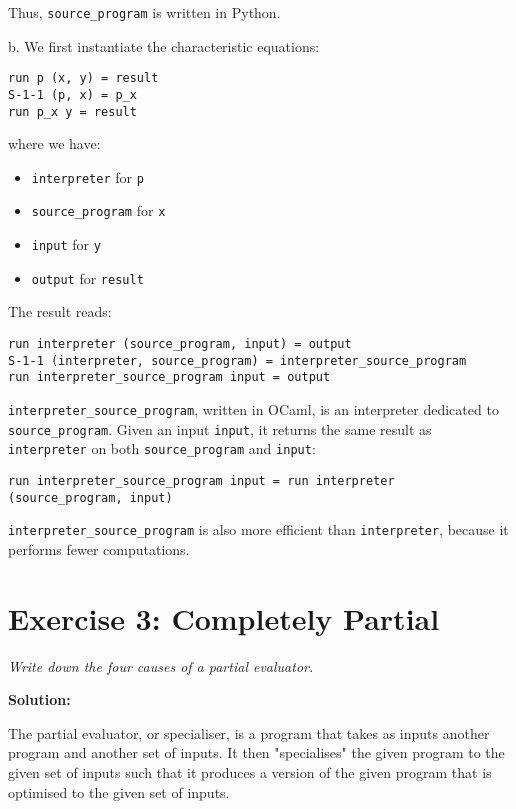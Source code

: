 \documentclass{article}
\begin{document}
Thus, \verb+source_program+ is written in Python. \linebreak

b. We first instantiate the characteristic equations:
\begin{lstlisting}
run p (x, y) = result
S-1-1 (p, x) = p_x
run p_x y = result
\end{lstlisting}
where we have:
\begin{itemize}
    \item \verb+interpreter+ for \verb+p+
    \item \verb+source_program+ for \verb+x+
    \item \verb+input+ for \verb+y+
    \item \verb+output+ for \verb+result+
\end{itemize}

The result reads:
\begin{lstlisting}
run interpreter (source_program, input) = output
S-1-1 (interpreter, source_program) = interpreter_source_program
run interpreter_source_program input = output
\end{lstlisting}

\verb+interpreter_source_program+, written in OCaml, is an interpreter dedicated to \verb+source_program+. Given an input \verb+input+, it returns the same result as \verb+interpreter+ on both \verb+source_program+ and \verb+input+:
\begin{lstlisting}
run interpreter_source_program input = run interpreter (source_program, input)
\end{lstlisting}


\verb+interpreter_source_program+ is also more efficient than \verb+interpreter+, because it performs fewer computations.
\newpage

\section{Exercise 3: Completely Partial}

\textit{Write down the four causes of a partial evaluator.} \linebreak \linebreak

\noindent \textbf{Solution:} \linebreak \linebreak

The partial evaluator, or specialiser, is a program that takes as inputs another program and another set of inputs. It then "specialises" the given program to the given set of inputs such that it produces a version of the given program that is optimised to the given set of inputs. \linebreak \linebreak
\end{document}
